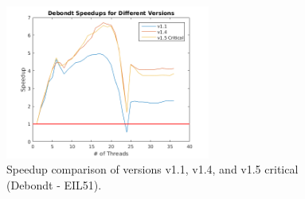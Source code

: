 \documentclass[10pt,letterpaper]{article}
\begin{document}
\begin{figure}
\centering
\includegraphics[width=0.6\textwidth]{../img/debondt_versions.png} 
\caption{Speedup comparison of versions v1.1, v1.4, and v1.5 critical (Debondt - EIL51).}
\label{fig:versions}
\end{figure}
\end{document}
